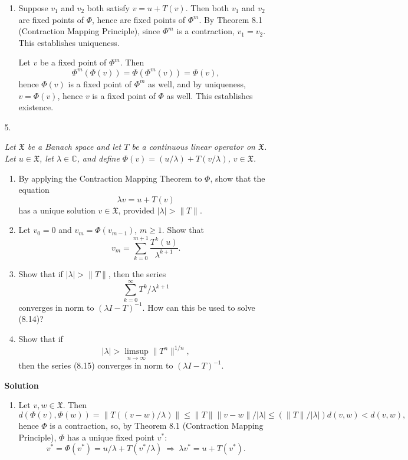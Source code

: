 \documentclass{article}
\begin{document}
\begin{enumerate}
\begin{itemize}
\begin{enumerate}
\item Suppose \(v_1\) and \(v_2\) both satisfy \(v = u + T(v)\).  Then both \(v_1\) and \(v_2\) are fixed points of \(\Phi\), hence are fixed points of \(\Phi^m\).  By Theorem 8.1 (Contraction Mapping Principle), since \(\Phi^m\) is a contraction, \(v_1 = v_2\).  This establishes uniqueness.

Let \(v\) be a fixed point of \(\Phi^m\).  Then
\[\Phi^m(\Phi(v)) = \Phi(\Phi^m(v)) = \Phi(v),\]
hence \(\Phi(v)\) is a fixed point of \(\Phi^m\) as well, and by uniqueness, \(v = \Phi(v)\), hence \(v\) is a fixed point of \(\Phi\) as well.  This establishes existence.

\end{enumerate}



\item[5.] {\em Let \(\mathfrak{X}\) be a Banach space and let \(T\) be a  continuous linear operator on \(\mathfrak{X}\).  Let \(u \in \mathfrak{X}\), let \(\lambda \in \mathbb{C}\), and define \(\Phi(v) = (u/\lambda) + T(v/\lambda)\), \(v \in \mathfrak{X}\).
\begin{enumerate}
\item By applying the Contraction Mapping Theorem to \(\Phi\), show that the equation
\[\lambda v = u + T(v)\]
has a unique solution \(v \in \mathfrak{X}\), provided \(|\lambda| > \|T\|\).
\item Let \(v_0 = 0\) and \(v_m = \Phi(v_{m - 1})\), \(m \geq 1\).  Show that
\[v_m = \sum_{k = 0}^{m + 1} \frac{T^k(u)}{\lambda^{k + 1}}.\]
\item Show that if \(|\lambda| > \|T\|\), then the series
\[\sum_{k = 0}^{\infty} T^k / \lambda^{k + 1}\]
converges in norm to \((\lambda I - T)^{-1}\).  How can this be used to solve (8.14)?
\item Show that if
\[|\lambda| > \limsup_{n \to \infty} \|T^n\|^{1/n},\]
then the series (8.15) converges in norm to \((\lambda I - T)^{-1}\).
\end{enumerate}}

{\bf Solution}

\begin{enumerate}
\item Let \(v,w \in \mathfrak{X}\).  Then
\[d(\Phi(v),\Phi(w))
     = \|T((v - w)/\lambda)\|
  \leq \|T\| \|v - w\| / |\lambda|
  \leq (\|T\| / |\lambda|) d(v,w)
     < d(v,w),\]
hence \(\Phi\) is a contraction, so, by Theorem 8.1 (Contraction Mapping Principle), \(\Phi\) has a unique fixed point \(v^*\):
\[v^* = \Phi(v^*) = u/\lambda + T(v^*/\lambda) \ \Rightarrow \ 
  \lambda v^* = u + T(v^*).\]


\end{enumerate}
\end{itemize}
\end{enumerate}
\end{document}
